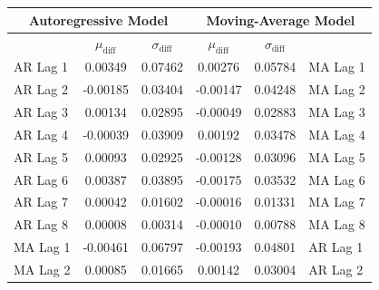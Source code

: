 \documentclass[oneside,12pt,openany]{book}
\begin{document}
		\begin{table}[hbt!]
			\centering
			\begin{tabular}{|l|c|c|c|c|l|}
				\hline
				\multicolumn{3}{|c|}{\textbf{Autoregressive Model}}   & \multicolumn{3}{c|}{\textbf{Moving-Average Model}}  \\ \hline
                \cellcolor{black} & $\mu_{\text{diff}}$ & $\sigma_{\text{diff}}$ & $\mu_{\text{diff}}$ & $\sigma_{\text{diff}}$ & \cellcolor{black}         \\ \hline
				AR Lag 1 & 0.00349                  & 0.07462                    & 0.00276                  & 0.05784                    & MA Lag 1 \\ \hline
				AR Lag 2 & -0.00185                 & 0.03404                    & -0.00147                 & 0.04248                    & MA Lag 2 \\ \hline
				AR Lag 3 & 0.00134                  & 0.02895                    & -0.00049                 & 0.02883                    & MA Lag 3 \\ \hline
				AR Lag 4 & -0.00039                 & 0.03909                    & 0.00192                  & 0.03478                    & MA Lag 4 \\ \hline
				AR Lag 5 & 0.00093                  & 0.02925                    & -0.00128                 & 0.03096                    & MA Lag 5 \\ \hline
				AR Lag 6 & 0.00387                  & 0.03895                    & -0.00175                 & 0.03532                    & MA Lag 6 \\ \hline
				AR Lag 7 & 0.00042                  & 0.01602                    & -0.00016                 & 0.01331                    & MA Lag 7 \\ \hline
				AR Lag 8 & 0.00008                  & 0.00314                    & -0.00010                 & 0.00788                    & MA Lag 8 \\ \hline
				MA Lag 1 & -0.00461                 & 0.06797                    & -0.00193                 & 0.04801                    & AR Lag 1 \\ \hline
				MA Lag 2 & 0.00085                  & 0.01665                    & 0.00142                  & 0.03004                    & AR Lag 2 \\ \hline
			\end{tabular}
		\end{table}
	
\end{document}
